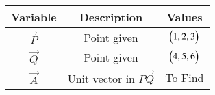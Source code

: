 
\begin{tabular}[12pt]{ |c| c| c|}
    \hline
    \textbf{Variable} & \textbf{Description} & \textbf{Values} \\ 
    \hline
    $\vec{P}$ & Point given & $\begin{pmatrix}1,2,3\end{pmatrix}$ \\
    \hline
    $\vec{Q}$ & Point given & $\begin{pmatrix}4,5,6\end{pmatrix}$ \\
    \hline
    $\vec{A}$ & Unit vector in  $\overrightarrow{PQ}$ & To Find\\
    \hline 
    \end{tabular}

